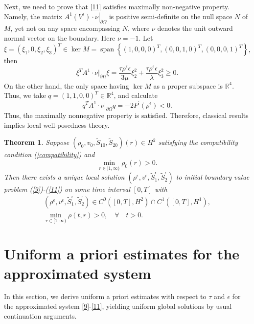 \documentclass[10pt,reqno]{amsart}
\numberwithin{equation}{section}
\newtheorem{theorem}{Theorem}[section]
\begin{document}
	Next, we need to prove that \eqref{11} satisfies maximally non-negative property. Namely, the matrix $\left.A^1\left(V^\epsilon\right) \cdot \nu\right|_{\partial \Omega}$ is positive semi-definite on the null space $N$ of $M$, yet not on any space encompassing $N$, where $\nu$ denotes the unit outward normal vector on the boundary. Here $\nu=-1$. Let $\xi=\left(\xi_1, 0, \xi_2,\xi_3\right)^T \in \operatorname{ker} M=\operatorname{span}\left\{(1,0,0,0)^T,(0,0,1,0)^T,(0,0,0,1)^T\right\}$, then 
	$$\xi^T A^1 \cdot \nu\big|_{\partial \Omega} \xi=
	\frac{\tau   \rho^{\epsilon}\epsilon}{3\mu}\xi_2^2+\frac{\tau  \rho^{\epsilon}\epsilon}{\lambda}\xi_3^2\geq0.$$
	On the other hand, the only space having $\operatorname{ker} M$ as a proper subspace is $\mathbb{R}^4$. Thus, we take $q=(1,1,0,0)^T\in \mathbb{R}^4$, and  calculate
	$$q^T A^1 \cdot \nu\big|_{\partial \Omega} q=-2P^{\prime}(\rho^{\epsilon})<0.$$
	Thus, the maximally nonnegative property is satisfied. Therefore, classical results implies local well-posedness theory\cite{schochet1986compressible}.
	
	\begin{theorem}
		Suppose $(\rho_0,v_0,\tilde{S}_{10},\tilde{S}_{20})(r)\in H^2$ satisfying the compatibility condition (\ref{compatibility}) and
		\begin{equation*}
			\min\limits_{r \in[1,\infty)} \rho_0(r)>0.
		\end{equation*}
		Then there exists a unique local solution $(\rho^\epsilon,v^\epsilon,\tilde{S}_1^{\epsilon},\tilde{S}_2^{\epsilon})$ to initial boundary value problem (\ref{9})-(\ref{11})
		on some time interval $[0, T]$ with
		$$
		\begin{array}{r}
			\left(\rho^\epsilon,v^\epsilon,\tilde{S}_1^{\epsilon},\tilde{S}_2^{\epsilon}\right) \in C^0\left([0, T], H^2\right) \cap C^1\left([0, T], H^1\right), \\
			\min \limits_{r \in[1,\infty)} \rho(t,r)>0, \quad \forall \quad t>0 . 
		\end{array}
		$$
	\end{theorem}
	\section{Uniform a priori estimates for the approximated system}\label{sec3}
	
	In this section, we derive uniform a priori estimates with respect to \(\tau\) and \(\epsilon\) for the approximated system \eqref{9}-\eqref{11}, yielding uniform global solutions by usual continuation arguments.
	
\end{document}

